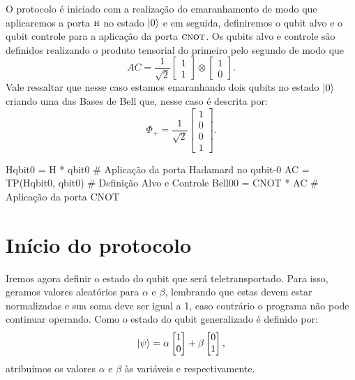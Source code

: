 O protocolo é iniciado com a realização do emaranhamento de modo que aplicaremos a porta \(\operatorname{\textsc{h}}\) no estado \(\ket{0}\) e em seguida, definiremos o qubit alvo e o qubit controle para a aplicação da porta \(\operatorname{\textsc{cnot}}\). Os qubits alvo e controle são definidos realizando o produto tensorial do primeiro pelo segundo de modo que
\[
  AC = \frac{1}{\sqrt{2}} \begin{bmatrix} 1 \\ 1 \end{bmatrix} \otimes \begin{bmatrix} 1 \\ 0 \end{bmatrix}.
\]
Vale ressaltar que nesse caso estamos emaranhando dois qubits no estado \(\ket{0}\) criando uma das Bases de Bell que, nesse caso é descrita por:
\[
  \Phi_+ = \frac{1}{\sqrt{2}} \begin{bmatrix} 1 \\ 0 \\ 0 \\ 1 \end{bmatrix}.
\]

\begin{pycode}
    Hqbit0 = H * qbit0      # Aplicação da porta Hadamard no qubit-0
    AC = TP(Hqbit0, qbit0)  # Definição Alvo e Controle
    Bell00 = CNOT * AC      # Aplicação da porta CNOT
\end{pycode}

\section{Início do protocolo}\label{emaranhamento}

Iremos agora definir o estado do qubit que será teletransportado. Para isso, geramos valores aleatórios para \(\alpha\) e \(\beta\), lembrando que estas devem estar normalizadas e sua soma deve ser igual a 1, caso contrário o programa não pode continuar operando. Como o estado do qubit generalizado é definido por:
\[ \ket{\psi} =
  \alpha \begin{bmatrix} 1 \\ 0 \end{bmatrix} +
  \beta \begin{bmatrix} 0 \\ 1 \end{bmatrix},
\]
atribuímos os valores \(\alpha\) e \(\beta\) às variáveis  e  respectivamente.

